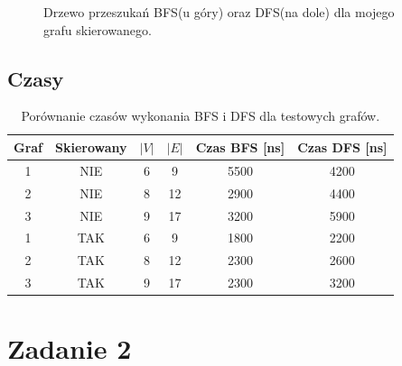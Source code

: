 \documentclass{article}
\begin{document}
\begin{figure}[H]
\centering
\hfill
\caption{Drzewo przeszukań BFS(u góry) oraz DFS(na dole) dla mojego grafu skierowanego.}
\end{figure}

\subsection{Czasy}
\begin{table}[H]
\begin{adjustbox}{center}
\begin{tabular}{|c|c|c|c|c|c|}
    \hline
    Graf & Skierowany & $|V|$ & $|E|$ & Czas BFS [ns] & Czas DFS [ns]\\
    \hline
    1 & NIE & 6 & 9 & 5500 & 4200\\
    \hline
    2 & NIE & 8 & 12 & 2900 & 4400\\
    \hline
    3 & NIE & 9 & 17 & 3200 & 5900\\
    \hline
    1 & TAK & 6 & 9 & 1800 & 2200\\
    \hline
    2 & TAK & 8 & 12 & 2300 & 2600\\
    \hline
    3 & TAK & 9 & 17 & 2300 & 3200\\
    \hline
\end{tabular}
\end{adjustbox}
\caption{Porównanie czasów wykonania BFS i DFS dla testowych grafów.}
\end{table}


\section{Zadanie 2}
\end{document}
